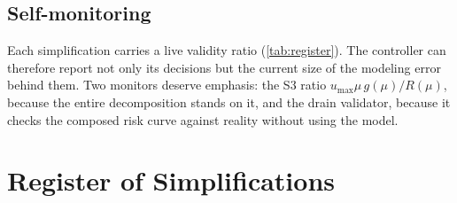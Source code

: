 \documentclass[11pt, a4paper]{article}
\theoremstyle{definition}
\theoremstyle{plain}
\theoremstyle{remark}
\begin{document}
\subsection{Self-monitoring}\label{sec:self-monitoring}

Each simplification carries a live validity ratio
(\cref{tab:register}).  The controller can therefore report not only
its decisions but the current size of the modeling error behind them.
Two monitors deserve emphasis: the S3 ratio
$u_{\max}\mu\,g(\mu)/R(\mu)$, because the entire decomposition stands
on it, and the drain validator, because it checks the composed risk
curve against reality without using the model.

\section{Register of Simplifications}\label{sec:register}
\end{document}
